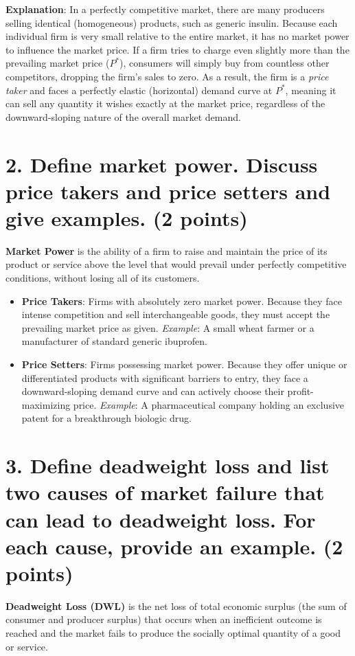 \documentclass[11pt, letterpaper]{article}
\begin{document}
\textbf{Explanation}: 
In a perfectly competitive market, there are many producers selling identical (homogeneous) products, such as generic insulin. Because each individual firm is very small relative to the entire market, it has no market power to influence the market price. If a firm tries to charge even slightly more than the prevailing market price ($P^*$), consumers will simply buy from countless other competitors, dropping the firm's sales to zero. As a result, the firm is a \textit{price taker} and faces a perfectly elastic (horizontal) demand curve at $P^*$, meaning it can sell any quantity it wishes exactly at the market price, regardless of the downward-sloping nature of the overall market demand.

\section*{2. Define market power. Discuss price takers and price setters and give examples. (2 points)}

\textbf{Market Power} is the ability of a firm to raise and maintain the price of its product or service above the level that would prevail under perfectly competitive conditions, without losing all of its customers.

\begin{itemize}[leftmargin=*]
    \item \textbf{Price Takers}: Firms with absolutely zero market power. Because they face intense competition and sell interchangeable goods, they must accept the prevailing market price as given. \textit{Example}: A small wheat farmer or a manufacturer of standard generic ibuprofen.
    \item \textbf{Price Setters}: Firms possessing market power. Because they offer unique or differentiated products with significant barriers to entry, they face a downward-sloping demand curve and can actively choose their profit-maximizing price. \textit{Example}: A pharmaceutical company holding an exclusive patent for a breakthrough biologic drug.
\end{itemize}

\section*{3. Define deadweight loss and list two causes of market failure that can lead to deadweight loss. For each cause, provide an example. (2 points)}

\textbf{Deadweight Loss (DWL)} is the net loss of total economic surplus (the sum of consumer and producer surplus) that occurs when an inefficient outcome is reached and the market fails to produce the socially optimal quantity of a good or service.
\end{document}
